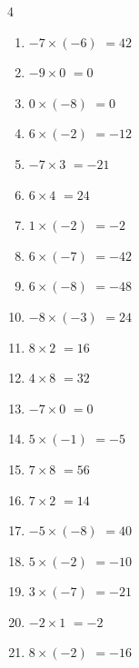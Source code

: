 \newpage
\resetdrill

\begin{multicols}{4}
\begin{enumerate}
  \itemsep=5pt
  \item $-7\times (-6)$
        $=42$

  \item $-9\times 0$
        $=0$

  \item $0\times (-8)$
        $=0$

  \item $6\times (-2)$
        $=-12$

  \item $-7\times 3$
        $=-21$

  \item $6\times 4$
        $=24$

  \item $1\times (-2)$
        $=-2$

  \item $6\times (-7)$
        $=-42$

  \item $6\times (-8)$
        $=-48$

  \item $-8\times (-3)$
        $=24$

  \item $8\times 2$
        $=16$

  \item $4\times 8$
        $=32$

  \item $-7\times 0$
        $=0$

  \item $5\times (-1)$
        $=-5$

  \item $7\times 8$
        $=56$

  \item $7\times 2$
        $=14$

  \item $-5\times (-8)$
        $=40$

  \item $5\times (-2)$
        $=-10$

  \item $3\times (-7)$
        $=-21$

  \item $-2\times 1$
        $=-2$

  \item $8\times (-2)$
        $=-16$


\end{enumerate}
\end{multicols}
